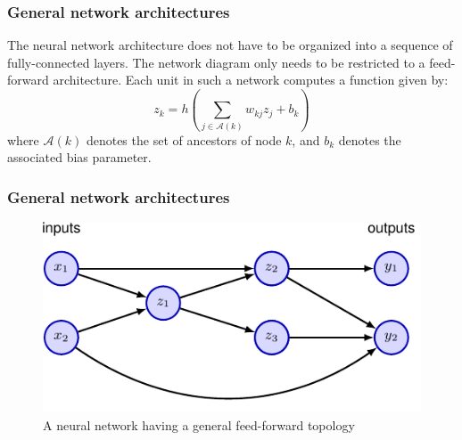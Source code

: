 \documentclass{beamer}
\begin{document}
\begin{frame}
    \frametitle{General network architectures}
    The neural network architecture does not have to be organized into a sequence of fully-connected layers. The network diagram only needs to be restricted to a feed-forward architecture. Each unit in such a network computes a function given by:
    \begin{equation*}
        z_{k}=h(\sum_{j\in\mathcal{A}(k)}w_{kj}z_{j}+b_{k})
    \end{equation*}
    where $\mathcal{A}(k)$ denotes the set of ancestors of node $k$, and $b_{k}$ denotes the associated bias parameter.
\end{frame}

\begin{frame}
    \frametitle{General network architectures}
    \begin{figure}
        \caption{A neural network having a general feed-forward topology}
        \includegraphics{Figure_15.pdf}
    \end{figure}
\end{frame}
\end{document}
